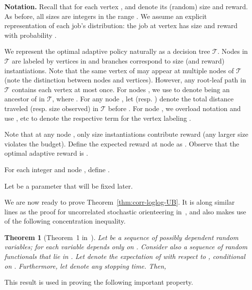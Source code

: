 \documentclass[11pt,letterpaper]{article}
\newtheorem{theorem}{Theorem}[section]
\numberwithin{algorithm}{section}
\newcommand{\T}{\ensuremath{\mathcal{T}}\xspace}
\begin{document}
{\bf Notation.} Recall that for each vertex ,  and  denote its (random) size and reward. As before, all sizes are integers in the range . We assume an explicit representation of each job's distribution: the job at vertex  has size  and reward  with probability .

We represent the optimal adaptive policy naturally as a decision tree \T. Nodes in \T are labeled by vertices in  and branches correspond to size (and reward) instantiations. Note that the same vertex of  may appear at multiple nodes of \T (note the distinction between nodes and vertices). However, any root-leaf path in \T contains each vertex at most once. For nodes , we use  to denote  being an ancestor of  in \T, where .
For any node , let  (resp. ) denote the total distance traveled (resp. size observed) in \T before . For node , we overload notation and use ,  etc to denote the respective term for the vertex labeling .

\def\rr{\ensuremath{\overline{r}}\xspace}

Note that at any node , only size instantiations  contribute reward (any larger size violates the budget).
Define the expected reward at node  as . Observe that the optimal adaptive reward is .

For each integer  and node , define .


Let  be a parameter that will be fixed later.

We are now ready to prove Theorem~\ref{thm:corr-loglog-UB}. It is along similar lines as the proof for uncorrelated stochastic orienteering in~\cite{GKNR12}, and also makes use of the following concentration inequality.

\begin{theorem}[Theorem~1 in~\cite{Zhang05}]\label{thm:zhang}
Let  be a sequence of possibly dependent random variables; for each  variable  depends
only on . Consider also a sequence of random functionals  that lie in . Let
 denote the expectation of  with respect to , conditional on . Furthermore, let
 denote any stopping time. Then,

\end{theorem}




This result is used in proving the following important property.
\end{document}
